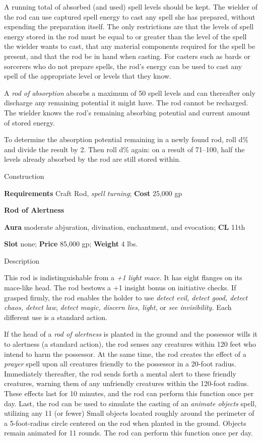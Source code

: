 A running total of absorbed (and used) spell levels should be kept. The wielder of the rod can use captured spell energy to cast any spell she has prepared, without expending the preparation itself. The only restrictions are that the levels of spell energy stored in the rod must be equal to or greater than the level of the spell the wielder wants to cast, that any material components required for the spell be present, and that the rod be in hand when casting. For casters such as bards or sorcerers who do not prepare spells, the rod's energy can be used to cast any spell of the appropriate level or levels that they know.
				
A \textit{rod of absorption} absorbs a maximum of 50 spell levels and can thereafter only discharge any remaining potential it might have. The rod cannot be recharged. The wielder knows the rod's remaining absorbing potential and current amount of stored energy.
				
To determine the absorption potential remaining in a newly found rod, roll d\% and divide the result by 2. Then roll d\% again: on a result of 71--100, half the levels already absorbed by the rod are still stored within. 
				
Construction
				
\textbf{Requirements} Craft Rod, \textit{spell turning}; \textbf{Cost }25,000 gp
				
\textbf{Rod of Alertness}
				
\textbf{Aura} moderate abjuration, divination, enchantment, and evocation;\textbf{ CL }11th
				
\textbf{Slot} none; \textbf{Price} 85,000 gp; \textbf{Weight} 4 lbs.
				
Description
				
This rod is indistinguishable from a \textit{+1 light mace. }It has eight flanges on its mace-like head. The rod bestows a +1 insight bonus on initiative checks. If grasped firmly, the rod enables the holder to use \textit{detect evil, detect good, detect chaos, detect law}, \textit{detect magic, discern lies, light, }or \textit{see invisibility. }Each different use is a standard action.
				
If the head of a \textit{rod of alertness} is planted in the ground and the possessor wills it to alertness (a standard action), the rod senses any creatures within 120 feet who intend to harm the possessor. At the same time, the rod creates the effect of a \textit{prayer} spell upon all creatures friendly to the possessor in a 20-foot radius. Immediately thereafter, the rod sends forth a mental alert to these friendly creatures, warning them of any unfriendly creatures within the 120-foot radius. These effects last for 10 minutes, and the rod can perform this function once per day. Last, the rod can be used to simulate the casting of an \textit{animate objects} spell, utilizing any 11 (or fewer) Small objects located roughly around the perimeter of a 5-foot-radius circle centered on the rod when planted in the ground. Objects remain animated for 11 rounds. The rod can perform this function once per day. 
				
